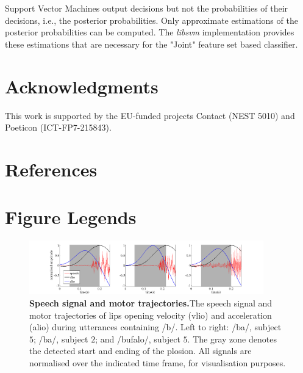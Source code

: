 \documentclass[10pt]{article}
\newcommand{\vlio}{\textsf{vlio}}
\newcommand{\alio}{\textsf{alio}}
\begin{document}
Support Vector Machines output decisions but not the probabilities of their 
decisions, i.e., the posterior probabilities. Only approximate estimations of 
the posterior probabilities can be computed. The \emph{libsvm} implementation provides these
estimations that are necessary for the "Joint" feature set based classifier.

\section*{Acknowledgments}
This work is supported by the EU-funded projects
  Contact (NEST 5010) and Poeticon (ICT-FP7-215843).

\section*{References}


\section*{Figure Legends}


\begin{figure}[ht]
\begin{center}
\includegraphics[width=4in]{figs/samples}
\end{center}
\caption{{\bf Speech signal and motor trajectories.}The speech signal and motor trajectories of lips opening
velocity (\vlio) and acceleration (\alio) during utterances containing /b/.
Left to right: /ba/, subject $5$; /ba/, subject $2$; and /bufalo/, subject $5$.
The gray zone denotes the detected start and ending of the plosion. All signals
are normalised over the indicated time frame, for visualisation purposes.}
\label{fig:isdView}
\end{figure}
\end{document}
